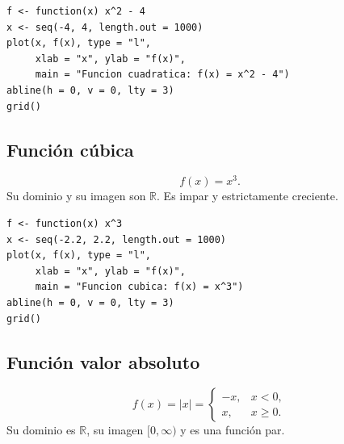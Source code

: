 \documentclass[12pt]{article}
\theoremstyle{remark}
\newcommand{\R}{\mathbb{R}}
\begin{document}
\begin{verbatim}
f <- function(x) x^2 - 4
x <- seq(-4, 4, length.out = 1000)
plot(x, f(x), type = "l",
     xlab = "x", ylab = "f(x)",
     main = "Funcion cuadratica: f(x) = x^2 - 4")
abline(h = 0, v = 0, lty = 3)
grid()
\end{verbatim}

\subsection*{Función cúbica}

\[
f(x)=x^3.
\]
Su dominio y su imagen son $\R$. Es impar y estrictamente creciente.

\begin{center}
\end{center}

\begin{verbatim}
f <- function(x) x^3
x <- seq(-2.2, 2.2, length.out = 1000)
plot(x, f(x), type = "l",
     xlab = "x", ylab = "f(x)",
     main = "Funcion cubica: f(x) = x^3")
abline(h = 0, v = 0, lty = 3)
grid()
\end{verbatim}

\subsection*{Función valor absoluto}

\[
f(x)=|x|=
\begin{cases}
-x,&x<0,\\
x,&x\geq0.
\end{cases}
\]
Su dominio es $\R$, su imagen $[0,\infty)$ y es una función par.

\begin{center}
\end{center}
\end{document}
